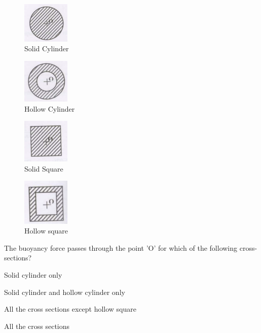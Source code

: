 \documentclass[12pt]{article}
\begin{document}
\begin{enumerate}[label=Q\arabic*.]
    
\begin{figure}[H]
\centering
  \includegraphics[width=0.2\textwidth]{figs/ass1_d_q6_1.png}
  \caption{Solid Cylinder}
\end{figure} 
\begin{figure}[H]
\centering
  \includegraphics[width=0.2\textwidth]{figs/ass1_d_q6_2.png}
  \caption{Hollow Cylinder}
  \end{figure} 
\begin{figure}[H]
\centering
  \includegraphics[width=0.2\textwidth]{figs/ass1_d_q6_3.png}
  \caption{Solid Square}
  \end{figure} 
\begin{figure}[H]
  \centering
  \includegraphics[width=0.2\textwidth]{figs/ass1_d_q6_4.png}
  \caption{Hollow square}
\end{figure}

The buoyancy force passes through the point 'O' for which of the following cross-sections?

\begin{enumerate}[label=(\Alph*)]
\begin{multicols}{2}
\item  Solid cylinder only 
\item  Solid cylinder and hollow cylinder \newline only 
\item  All the cross sections except hollow square 
\item  All the cross sections
\end{multicols}
\end{enumerate}


\end{enumerate}
\end{document}
